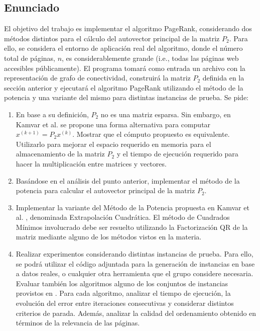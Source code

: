 \subsection{Enunciado}

El objetivo del trabajo es implementar el algoritmo PageRank, considerando dos m\'etodos distintos para el c\'alculo del
autovector principal de la matriz $P_2$. Para ello, se considera el entorno de aplicaci\'on real del algoritmo, donde el
n\'umero total de p\'aginas, $n$, es considerablemente grande (i.e., todas las p\'aginas web accesibles p\'ublicamente).
El programa tomar\'a como entrada un archivo con la representaci\'on de grafo de conectividad, construir\'a la matriz
$P_2$ definida en la secci\'on anterior y ejecutar\'a el algoritmo PageRank utilizando el m\'etodo de la potencia y una 
variante del mismo para distintas instancias de prueba. Se pide:

\begin{enumerate}
\item En base a su definici\'on, $P_2$ no es una matriz esparsa. Sin embargo, en Kamvar et al. \cite[Algoritmo
1]{Kamvar2003} se propone una forma alternativa para computar $x^{(k+1)} = P_2 x^{(k)}$. Mostrar que el c\'omputo
propuesto es equivalente. Utilizarlo para mejorar el espacio requerido en memoria para el almacenamiento de la matriz
$P_2$ y el tiempo de ejecuci\'on requerido para hacer la multiplicaci\'on entre matrices y vectores. 

\item Bas\'andose en el an\'alisis del punto anterior, implementar el m\'etodo de la potencia para calcular el
autovector principal de la matriz $P_2$.

\item Implementar la variante del M\'etodo de la Potencia propuesta en Kamvar et al. \cite[Secci\'on 5]{Kamvar2003},
denominada Extrapolaci\'on Cuadr\'atica. El m\'etodo de Cuadrados M\'inimos involucrado debe ser resuelto utilizando la
Factorizaci\'on QR de la matriz mediante alguno de los m\'etodos vistos en la materia.

\item Realizar experimentos considerando distintas instancias de prueba. Para ello, se podr\'a utilizar el c\'odigo
adjuntada para la generaci\'on de instancias en base a datos reales, o cualquier otra herramienta que el grupo considere
necesaria. Evaluar tambi\'en los algoritmos alguno de los conjuntos de instancias
provistos en \cite{SNAP}. Para cada algoritmo, analizar el tiempo de
ejecuci\'on, la evoluci\'on del error entre iteraciones consecutivas y considerar distintos criterios de parada. 
Adem\'as, analizar la calidad del ordenamiento obtenido en t\'erminos de la relevancia de las p\'aginas.
\end{enumerate}

